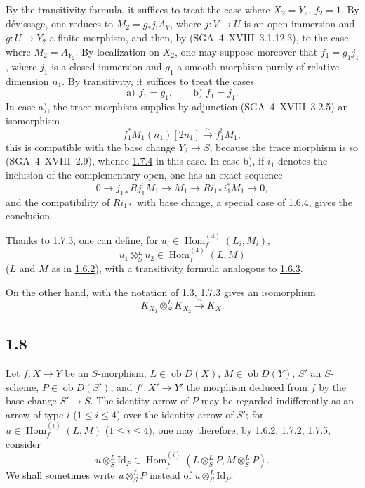 \documentclass[11pt]{article}
\DeclareMathOperator{\Hom}{Hom}
\newcommand{\ob}{\operatorname{ob}}
\providecommand{\Id}{\mathrm{Id}}
\providecommand{\Hom}{\operatorname{Hom}}
\providecommand{\ob}{\operatorname{ob}}
\providecommand{\Hom}{\operatorname{Hom}}
\begin{document}
By the transitivity formula, it suffices to treat the case where $X_2=Y_2$, $f_2=1$. By dévissage, one reduces to $M_2=g_{*}j_{!}A_V$, where $j:V\to U$ is an open immersion and $g:U\to Y_2$ a finite morphism, and then, by (SGA~4~XVIII~3.1.12.3), to the case where $M_2=A_{Y_2}$. By localization on $X_2$, one may suppose moreover that $f_1=g_1j_1$, where $j_1$ is a closed immersion and $g_1$ a smooth morphism purely of relative dimension $n_1$. By transitivity, it suffices to treat the cases
\[
\text{a) } f_1=g_1,\qquad \text{b) } f_1=j_1.
\]
In case a), the trace morphism supplies by adjunction (SGA~4~XVIII~3.2.5) an isomorphism
\[
f_1^{*}M_1(n_1)[2n_1]\xrightarrow{\sim}f_1^{!}M_1;
\]
this is compatible with the base change $Y_2\to S$, because the trace morphism is so (SGA~4~XVIII~2.9), whence \hyperref[sga5:III:proposition:1.7.4]{1.7.4} in this case. In case b), if $i_1$ denotes the inclusion of the complementary open, one has an exact sequence
\[
0\longrightarrow j_{1*}Rj_1^{!}M_1\longrightarrow M_1\longrightarrow Ri_{1*}i_1^{*}M_1\longrightarrow0,
\]
and the compatibility of $Ri_{1*}$ with base change, a special case of \hyperref[sga5:III:equation:1.6.4]{1.6.4}, gives the conclusion.

Thanks to \hyperref[sga5:III:equation:1.7.3]{1.7.3}, one can define, for $u_i\in\Hom_f^{(4)}(L_i,M_i)$,
\begin{equation}\tag{1.7.5}\label{sga5:III:equation:1.7.5}
u_1\otimes^L_Su_2\in\Hom_f^{(4)}(L,M)
\end{equation}
($L$ and $M$ as in \hyperref[sga5:III:equation:1.6.2]{1.6.2}), with a transitivity formula analogous to \hyperref[sga5:III:equation:1.6.3]{1.6.3}.

On the other hand, with the notation of \hyperref[sga5:III:subsection:1.3]{1.3}, \hyperref[sga5:III:equation:1.7.3]{1.7.3} gives an isomorphism
\begin{equation}\tag{1.7.6}\label{sga5:III:equation:1.7.6}
K_{X_1}\otimes^L_SK_{X_2}\xrightarrow{\sim}K_X.
\end{equation}

\subsection*{1.8}\label{sga5:III:subsection:1.8}
Let $f:X\to Y$ be an $S$-morphism, $L\in\ob D(X)$, $M\in\ob D(Y)$, $S'$ an $S$-scheme, $P\in\ob D(S')$, and $f':X'\to Y'$ the morphism deduced from $f$ by the base change $S'\to S$. The identity arrow of $P$ may be regarded indifferently as an arrow of type $i$ ($1\leq i\leq4$) over the identity arrow of $S'$; for $u\in\Hom_f^{(i)}(L,M)$ ($1\leq i\leq4$), one may therefore, by \hyperref[sga5:III:equation:1.6.2]{1.6.2}, \hyperref[sga5:III:equation:1.7.2]{1.7.2}, \hyperref[sga5:III:equation:1.7.5]{1.7.5}, consider
\begin{equation}\tag{1.8.1}\label{sga5:III:equation:1.8.1}
u\otimes^L_S\Id_P\in\Hom_{f'}^{(i)}(L\otimes^L_SP,M\otimes^L_SP).
\end{equation}
We shall sometimes write $u\otimes^L_SP$ instead of $u\otimes^L_S\Id_P$.
\end{document}
